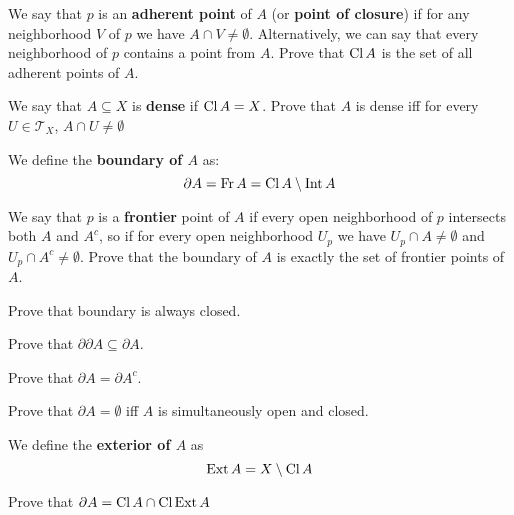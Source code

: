 \begin{prob}
	We say that $p$ is an \textbf{adherent point} of $A$
  (or \textbf{point of closure})
  if for any neighborhood $V$ of $p$ we have
  $A\cap V\neq \emptyset$. Alternatively, we can say that every
  neighborhood of $p$ contains
  a point from $A$. Prove that $\text{Cl\,} A$ is the set
	of all adherent points of $A$.
\end{prob}

\begin{prob}
  We say that $A\subseteq X$ is \textbf{dense} if $\text{Cl\,} A=X$. Prove
  that $A$ is dense iff for every $U\in \mathcal T_X$, $A\cap U\neq \emptyset$
\end{prob}

\noindent We define the \textbf{boundary of $A$} as:
$$\partial A=\text{Fr\,} A = \text{Cl\,} A \setminus \text{Int\,} A$$

\begin{prob}
  We say that $p$ is a \textbf{frontier} point of $A$ if every open
  neighborhood of $p$ intersects both $A$ and $A^c$, so if
  for every open neighborhood $U_p$ we have
  $U_p\cap A\neq \emptyset$ and $U_p\cap A^c\neq \emptyset$.
  Prove that the boundary of $A$ is exactly the set of frontier
  points of $A$.
\end{prob}

\begin{prob}
  Prove that boundary is always closed.
\end{prob}

\begin{prob}
  Prove that $\partial \partial A \subseteq \partial A$.
\end{prob}

\begin{prob}
  Prove that $\partial A = \partial A^c.$
\end{prob}

\begin{prob}
  Prove that $\partial A = \emptyset$ iff $A$ is simultaneously
  open and closed.
\end{prob}

We define the \textbf{exterior of $A$} as
$$\text{Ext\,} A = X\setminus \text{Cl\,} A$$

\begin{prob}
  Prove that $\partial A=\text{Cl\,} A \cap \text{Cl\,} \text{Ext\,} A$
\end{prob}
